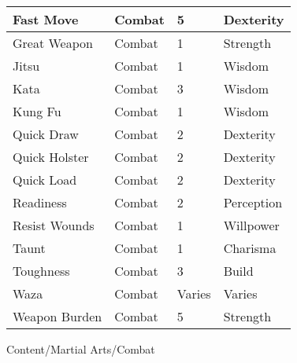 \documentclass[twoside]{book}
\begin{document}
\begin{longtable}{p{1.25in}lll}
  \raggedright
           Fast Move 
  &
   Combat 
  &
   5 
  &
   Dexterity 
  \tabularnewline
  \hline
      
  \raggedright
           Great Weapon 
  &
   Combat 
  &
   1 
  &
   Strength 
  \tabularnewline
  \hline
      
  \raggedright
           Jitsu 
  &
   Combat 
  &
   1 
  &
   Wisdom 
  \tabularnewline
  \hline
      
  \raggedright
           Kata 
  &
   Combat 
  &
   3 
  &
   Wisdom 
  \tabularnewline
  \hline
      
  \raggedright
           Kung Fu 
  &
   Combat 
  &
   1 
  &
   Wisdom 
  \tabularnewline
  \hline
      
  \raggedright
           Quick Draw 
  &
   Combat 
  &
   2 
  &
   Dexterity 
  \tabularnewline
  \hline
      
  \raggedright
           Quick Holster 
  &
   Combat 
  &
   2 
  &
   Dexterity 
  \tabularnewline
  \hline
      
  \raggedright
           Quick Load 
  &
   Combat 
  &
   2 
  &
   Dexterity 
  \tabularnewline
  \hline
      
  \raggedright
           Readiness 
  &
   Combat 
  &
   2 
  &
   Perception 
  \tabularnewline
  \hline
      
  \raggedright
           Resist Wounds 
  &
   Combat 
  &
   1 
  &
   Willpower 
  \tabularnewline
  \hline
      
  \raggedright
           Taunt 
  &
   Combat 
  &
   1 
  &
   Charisma 
  \tabularnewline
  \hline
      
  \raggedright
           Toughness 
  &
   Combat 
  &
   3 
  &
   Build 
  \tabularnewline
  \hline
      
  \raggedright
           Waza 
  &
   Combat 
  &
   Varies 
  &
   Varies 
  \tabularnewline
  \hline
      
  \raggedright
           Weapon Burden 
  &
   Combat 
  &
   5 
  &
   Strength 
  \tabularnewline
  \hline
      
\end{longtable}
    Content/Martial Arts/Combat
\hspace{-2ex}
\end{document}
